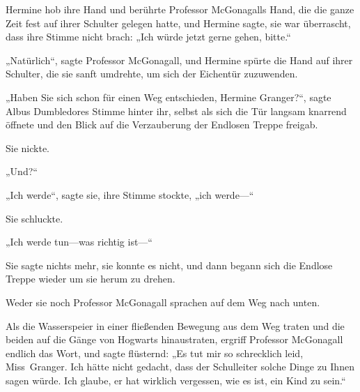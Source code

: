 Hermine hob ihre Hand und berührte Professor McGonagalls Hand, die die ganze Zeit fest auf ihrer Schulter gelegen hatte, und Hermine sagte, sie war überrascht, dass ihre Stimme nicht brach: „Ich würde jetzt gerne gehen, bitte.“

„Natürlich“, sagte Professor McGonagall, und Hermine spürte die Hand auf ihrer Schulter, die sie sanft umdrehte, um sich der Eichentür zuzuwenden.

„Haben Sie sich schon für einen Weg entschieden, Hermine Granger?“, sagte Albus Dumbledores Stimme hinter ihr, selbst als sich die Tür langsam knarrend öffnete und den Blick auf die Verzauberung der Endlosen Treppe freigab.

Sie nickte.

„Und?“

„Ich werde“, sagte sie, ihre Stimme stockte, „ich werde—“

Sie schluckte.

„Ich werde tun—was richtig ist—“

Sie sagte nichts mehr, sie konnte es nicht, und dann begann sich die Endlose Treppe wieder um sie herum zu drehen.

Weder sie noch Professor McGonagall sprachen auf dem Weg nach unten.

Als die Wasserspeier in einer fließenden Bewegung aus dem Weg traten und die beiden auf die Gänge von Hogwarts hinaustraten, ergriff Professor McGonagall endlich das Wort, und sagte flüsternd: „Es tut mir so schrecklich leid, Miss~Granger. Ich hätte nicht gedacht, dass der Schulleiter solche Dinge zu Ihnen sagen würde. Ich glaube, er hat wirklich vergessen, wie es ist, ein Kind zu sein.“

